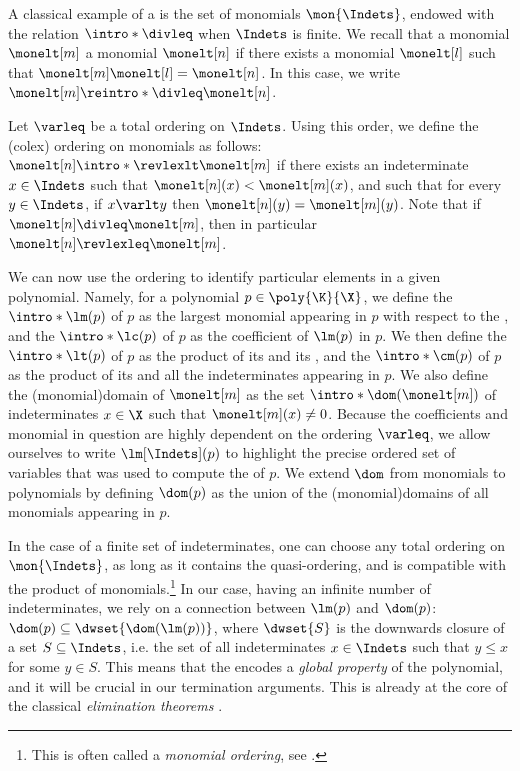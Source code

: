 A classical example of a  is the set of monomials $\mon{\Indets}$,
endowed with the  relation $\intro*\divleq$ when $\Indets$
is finite. We recall that a monomial $\monelt[m]$  a monomial
$\monelt[n]$ if there exists a monomial $\monelt[l]$ such that $\monelt[m]\monelt[l] = \monelt[n]$. In this case, we write $\monelt[m]
\reintro*\divleq \monelt[n]$.

\AP Let $\varleq$ be a total ordering on $\Indets$.
Using this order,
we define the  (colex) ordering on monomials as follows:
$\monelt[n] \intro*\revlexlt \monelt[m]$ if there exists an
indeterminate $x \in \Indets$ such that $\monelt[n](x) < \monelt[m](x)$,
and such that for every $y \in \Indets$,
if $x \varlt y$ then $\monelt[n](y) = \monelt[m](y)$. Note that if $\monelt[n] \divleq \monelt[m]$,
then in particular $\monelt[n] \revlexleq \monelt[m]$. 

\AP We can now use the  ordering to identify particular elements in a given polynomial. Namely, for a polynomial $p \in \poly{\K}{\X}$, we define
the  $\intro*\lm(p)$ of $p$ as the largest monomial
appearing in $p$ with respect to the , and the
 $\intro*\lc(p)$ of $p$ as the coefficient of
$\lm(p)$ in $p$. We then define the  $\intro*\lt(p)$ of
$p$ as the product of its  and its ,
and the  $\intro*\cm(p)$ of $p$ as
the product of its  and all the indeterminates appearing
in $p$.
We also define the \intro(monomial){domain} of $\monelt[m]$ as the set
$\intro*\dom(\monelt[m])$ of indeterminates $x \in \X$ such that $\monelt[m](x) \neq
0$. Because the coefficients and monomial in question are highly dependent on
the ordering $\varleq$, we allow ourselves to write $\lm[\Indets](p)$ to
highlight the precise ordered set of variables that was used to compute the
 of $p$. We extend $\dom$ from 
monomials to polynomials by defining $\dom(p)$ as 
the union of the \kl(monomial){domains} of all monomials appearing in $p$.

\begin{remark}\label{rem:other-monomial-orderings}
In the case of a finite set of indeterminates, one can choose any total ordering
on $\mon{\Indets}$, as long as it contains the 
quasi-ordering, and is compatible with the product of monomials.\footnote{This
is often called a \emph{monomial ordering}, see \cite{CLO15}.} In our case,
having an infinite number of indeterminates, we rely on a connection between
$\lm(p)$ and $\dom(p)$: $\dom(p) \subseteq \dwset{\dom(\lm(p))}$, where
$\dwset{S}$ is the downwards closure of a set $S \subseteq \Indets$, i.e. the
set of all indeterminates $x \in \Indets$ such that $y \leq x$ for some $y \in
S$. This means that the  encodes a \emph{global property}
of the polynomial, and it will be crucial in our termination arguments. This is
already at the core of the classical \emph{elimination theorems} \cite[Chapter 3, Theorem
2]{CLO15}.
\end{remark}

